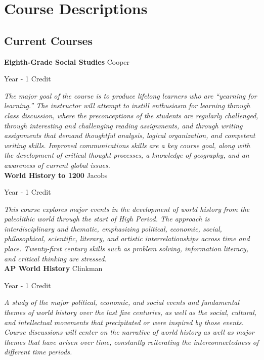 \section{Course Descriptions}

\subsection{Current Courses}
\noindent\textbf{Eighth-Grade Social Studies} \hfill Cooper

\noindent Year - 1 Credit

\vspace{1mm}\emph{The major goal of the course is to produce lifelong learners who are “yearning for learning.”  The instructor will attempt to instill enthusiasm for learning through class discussion, where the preconceptions of the students are regularly challenged, through interesting and challenging reading assignments, and through writing assignments that demand thoughtful analysis, logical organization, and competent writing skills.  Improved communications skills are a key course goal, along with the development of critical thought processes, a knowledge of geography, and an awareness of current global issues.}\\

\noindent\textbf{World History to 1200} \hfill Jacobs

\noindent Year - 1 Credit

\vspace{1mm}\emph{This course explores major events in the development of world history from the paleolithic world through the start of High Period. The approach is interdisciplinary and thematic, emphasizing political, economic, social, philosophical, scientific, literary, and artistic interrelationships across time and place. Twenty-first century skills such as problem solving, information literacy, and critical thinking are stressed.}\\

\noindent\textbf{AP World History} \hfill Clinkman

\noindent Year - 1 Credit

\vspace{1mm}\emph{A study of the major political, economic, and social events and fundamental themes of world history over the last five centuries, as well as the social, cultural, and intellectual movements that precipitated or were inspired by those events. Course discussions will center on the narrative of world history as well as major themes that have arisen over time, constantly reiterating the interconnectedness of different time periods.}\\

